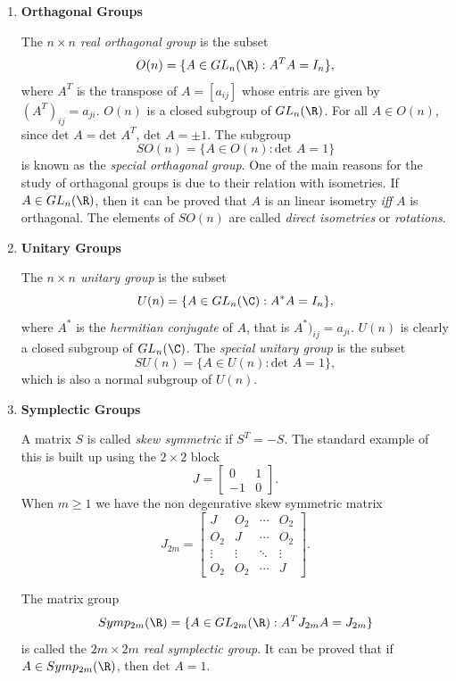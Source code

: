 \begin{examples}
\begin{enumerate}
    \item {\bf Orthagonal Groups}

      The {\it \(n\times n\) real orthagonal group} is the subset
      \[ O(n)=\{A\in GL_n(\R):A^TA=I_n \}, \]
      where \(A^T\) is the transpose of \(A=[a_{ij}]\) whose entris are given by
      \((A^T)_{ij}=a_{ji}\). \(O(n)\) is a closed subgroup of \(GL_n(\R)\). For all \(A\in O(n)\),
      since \(\text{det } A= \text{det } A^T\), \(\text{det } A= \pm 1\). The subgroup
      \[ SO(n)=\{A\in O(n):\text{det } A=1 \} \]
      is known as the {\it special orthagonal group}. One of the main reasons for
      the study of orthagonal groups is due to their relation with isometries. If \(A\in GL_n(\R)\),
      then it can be proved that \(A\) is an linear isometry {\it iff} \(A\) is orthagonal.
      The elements of \(SO(n)\) are called {\it direct isometries} or {\it rotations}.

    \item {\bf Unitary Groups}

      The {\it \(n\times n\) unitary group} is the subset
      \[ U(n)=\{A\in GL_n(\C):A^*A=I_n \}, \]
      where \(A^*\) is the {\it hermitian conjugate} of \(A\), that is \(A^*)_{ij}=a_{ji}\).
      \(U(n)\) is clearly a closed subgroup of \(GL_n(\C)\). The {\it special unitary group}
      is the subset
      \[ SU(n)=\{A\in U(n):\text{det } A=1 \}, \]
      which is also a normal subgroup of \(U(n)\).

    \item {\bf Symplectic Groups}

      A matrix \(S\) is called {\it skew symmetric} if \(S^T=-S\). The standard example of
      this is built up using the \(2\times 2\) block
      \[
        J=
        \left[\begin{array}{cc}
            0 & 1 \\
            -1 & 0
        \end{array}\right].
      \]
      When \(m\ge1\) we have the non degenrative skew symmetric matrix
      \[
        J_{2m}=
        \left[\begin{array}{cccc}
            J & O_2 & \cdots & O_2 \\
            O_2 & J & \cdots & O_2 \\
            \vdots & \vdots & \ddots & \vdots \\
            O_2 & O_2 & \cdots & J
        \end{array}\right].
      \]

      The matrix group
      \[ Symp_{2m}(\R)=\{A\in GL_{2m}(\R): A^TJ_{2m}A=J_{2m} \} \]
      is called the {\it \(2m\times 2m\) real symplectic group}. It can be proved that if
      \(A\in Symp_{2m}(\R)\), then \(\text{det } A=1\).

  \end{enumerate}
\end{examples}

